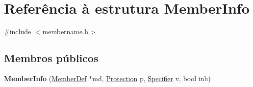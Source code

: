 \hypertarget{struct_member_info}{\section{Referência à estrutura Member\-Info}
\label{struct_member_info}
}


{\ttfamily \#include $<$membername.\-h$>$}

\subsection*{Membros públicos}
\begin{DoxyCompactItemize}
\item 
\hypertarget{struct_member_info_a386329486fb1b9b451d5d199bb331235}{{\bfseries Member\-Info} (\hyperlink{class_member_def}{Member\-Def} $\ast$md, \hyperlink{types_8h_a90e352184df58cd09455fe9996cd4ded}{Protection} p, \hyperlink{types_8h_ab16236bdd10ddf4d73a9847350f0017e}{Specifier} v, bool inh)}\label{struct_member_info_a386329486fb1b9b451d5d199bb331235}

\end{DoxyCompactItemize}
